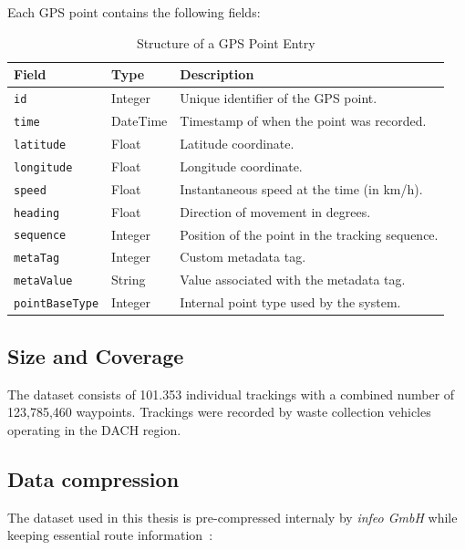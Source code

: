 \documentclass[a4paper,12pt,twoside]{scrreprt}
\begin{document}
Each GPS point contains the following fields:
\begin{table}[H]
  \centering
  \caption{Structure of a GPS Point Entry}
  \label{tab:gps_point_structure}
  \begin{tabular}{|l|l|p{8cm}|}
    \hline
    \textbf{Field}         & \textbf{Type} & \textbf{Description}
    \\
    \hline
    \texttt{id}            & Integer       & Unique identifier of the GPS
    point.
    \\
    \hline
    \texttt{time}          & DateTime      & Timestamp of when the point was
    recorded.
    \\
    \hline
    \texttt{latitude}      & Float         & Latitude coordinate.
    \\
    \hline
    \texttt{longitude}     & Float         & Longitude coordinate.
    \\
    \hline
    \texttt{speed}         & Float         & Instantaneous speed at the time
    (in km/h).
    \\
    \hline
    \texttt{heading}       & Float         & Direction of movement in degrees.
    \\
    \hline
    \texttt{sequence}      & Integer       & Position of the point in the
    tracking
    sequence.
    \\
    \hline
    \texttt{metaTag}       & Integer       & Custom metadata tag.
    \\
    \hline
    \texttt{metaValue}     & String        & Value associated with the metadata
    tag.
    \\
    \hline
    \texttt{pointBaseType} & Integer       & Internal point type used by the
    system.
    \\
    \hline
  \end{tabular}
\end{table}

\clearpage
\subsection{Size and Coverage}

The dataset consists of 101.353 individual trackings with a combined number of
123,785,460 waypoints.
Trackings were recorded by waste collection vehicles operating in the DACH
region.

\subsection{Data compression}
The dataset used in this thesis is pre-compressed internaly by \textit{infeo
  GmbH} while keeping essential route information~\cite{noauthor_route_nodate}:
\end{document}
